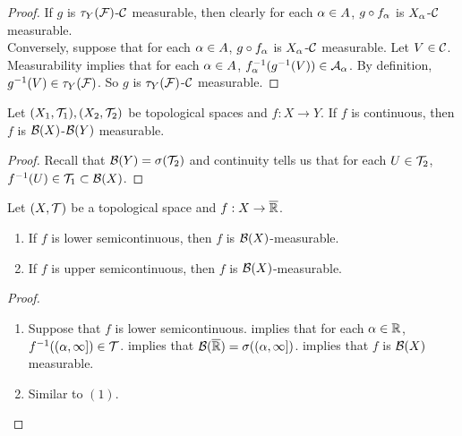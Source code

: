 \documentclass{book}
\begin{document}
	\begin{proof}
		If $g$ is $\tau_Y(\mathcal{F})$-$\mathcal{C}$ measurable, then clearly for each $\alpha \in A$, $g \circ f_{\alpha}$ is $X_{\alpha}$-$\mathcal{C}$ measurable. \\
		Conversely, suppose that for each $\alpha \in A$, $g \circ f_{\alpha}$ is $X_{\alpha}$-$\mathcal{C}$ measurable. Let $V \in \mathcal{C}$. Measurability implies that for each $\alpha \in A$, $f_{\alpha}^{-1}(g^{-1}(V)) \in \mathcal{A}_{\alpha}$. By definition, $g^{-1}(V) \in \tau_Y(\mathcal{F})$. So $g$ is $\tau_Y(\mathcal{F})$-$\mathcal{C}$ measurable.
	\end{proof}
	
	\begin{ex} 
		Let $(X_1,\mathcal{T}_1), (X_2,\mathcal{T}_2)$ be topological spaces and $f: X \rightarrow Y$. If $f$ is continuous, then $f$ is $\mathcal{B}(X)$-$\mathcal{B}(Y)$ measurable.
	\end{ex}
	
	\begin{proof}
		Recall that $\mathcal{B}(Y) = \sigma(\mathcal{T}_2)$ and continuity tells us that for each $U \in \mathcal{T}_2$, $f^{-1}(U) \in \mathcal{T}_1 \subset \mathcal{B}(X)$. 
	\end{proof}

	\begin{ex} 
		Let $(X, \mathcal{T})$ be a topological space and $f:X \rightarrow \overline{\mathbb{R}}$. 
		\begin{enumerate}
			\item If $f$ is lower semicontinuous, then $f$ is $\mathcal{B}(X)$-measurable.
			\item If $f$ is upper semicontinuous, then $f$ is $\mathcal{B}(X)$-measurable.
		\end{enumerate}
	\end{ex}

	\begin{proof}\
		\begin{enumerate}
			\item Suppose that $f$ is lower semicontinuous.  implies that for each $\alpha \in \mathbb{R}$, $f^{-1}((\alpha, \infty]) \in \mathcal{T}$.   implies that $\mathcal{B}(\overline{\mathbb{R}}) = \sigma((\alpha, \infty])$.  implies that $f$ is $\mathcal{B}(X)$ measurable.
			\item Similar to $(1)$.
		\end{enumerate}
	\end{proof}

	\begin{ex} 
	\end{ex}
	
\end{document}
